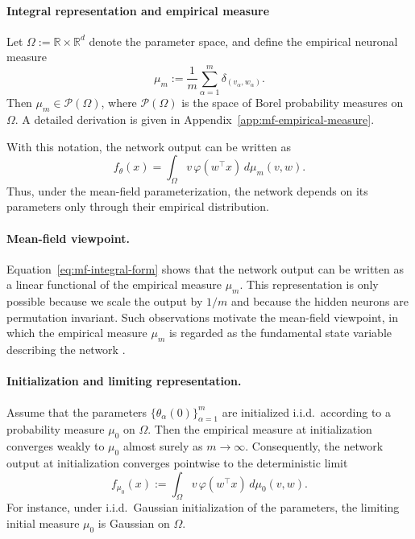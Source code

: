 \paragraph{Integral representation and empirical measure}

Let $\Omega := \mathbb{R} \times \mathbb{R}^d$ denote the parameter space, and define
the empirical neuronal measure
\begin{equation}
	\mu_m := \frac{1}{m}\sum_{\alpha=1}^m \delta_{(v_\alpha,w_\alpha)}.
	\label{eq:empirical-measure}
\end{equation}
Then $\mu_m \in \mathcal P(\Omega)$, where $\mathcal P(\Omega)$ is the space of
Borel probability measures on $\Omega$. A detailed derivation is given in
Appendix~\ref{app:mf-empirical-measure}.

With this notation, the network output can be written as
\begin{equation}
	f_\theta(x)
	=
	\int_{\Omega} v\,\varphi(w^\top x)\,d\mu_m(v,w).
	\label{eq:mf-integral-form}
\end{equation}
Thus, under the mean-field parameterization, the network depends on its
parameters only through their empirical distribution.

\paragraph{Mean-field viewpoint.}
Equation~\eqref{eq:mf-integral-form} shows that the network output can be
written as a linear functional of the empirical measure $\mu_m$. This
representation is only possible because we scale the output by $1/m$ and
because the hidden neurons are permutation invariant. Such observations
motivate the mean-field viewpoint, in which the empirical measure $\mu_m$ is
regarded as the fundamental state variable describing the network
\citep{Mei2018meanfieldview,chizat2018globalconvergencegradientdescent}.

\paragraph{Initialization and limiting representation.}
Assume that the parameters $\{\theta_\alpha(0)\}_{\alpha=1}^m$ are initialized
i.i.d.\ according to a probability measure $\mu_0$ on $\Omega$. Then the
empirical measure at initialization converges weakly to $\mu_0$ almost surely
as $m\to\infty$. Consequently, the network output at initialization converges
pointwise to the deterministic limit
\[
	f_{\mu_0}(x)
	:=
	\int_\Omega v\,\varphi(w^\top x)\,d\mu_0(v,w).
\]
For instance, under i.i.d.\ Gaussian initialization of the parameters, the
limiting initial measure $\mu_0$ is Gaussian on $\Omega$.

